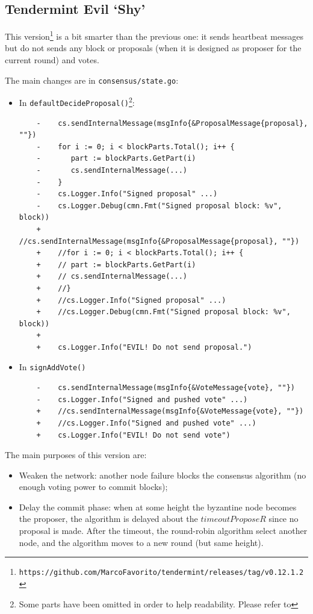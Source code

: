 \documentclass[]{article}
\begin{document}
\subsection{Tendermint Evil `Shy'}
\label{shy}
This version\footnote{\texttt{https://github.com/MarcoFavorito/tendermint/releases/tag/v0.12.1.2}} is a bit smarter than the previous one: it sends heartbeat messages but do not sends any block or proposals (when it is designed as proposer for the current round) and votes.

The main changes are in \texttt{consensus/state.go}:
\begin{itemize}
	\item In \texttt{defaultDecideProposal()}\footnote{Some parts have been omitted in order to help readability. Please refer to }:
	\begin{verbatim}
	-    cs.sendInternalMessage(msgInfo{&ProposalMessage{proposal}, ""})
	-    for i := 0; i < blockParts.Total(); i++ {
	-    	part := blockParts.GetPart(i)
	-    	cs.sendInternalMessage(...)
	-    }
	-    cs.Logger.Info("Signed proposal" ...)
	-    cs.Logger.Debug(cmn.Fmt("Signed proposal block: %v", block))
	+    //cs.sendInternalMessage(msgInfo{&ProposalMessage{proposal}, ""})
	+    //for i := 0; i < blockParts.Total(); i++ {
	+    //	part := blockParts.GetPart(i)
	+    //	cs.sendInternalMessage(...)
	+    //}
	+    //cs.Logger.Info("Signed proposal" ...)
	+    //cs.Logger.Debug(cmn.Fmt("Signed proposal block: %v", block))
	+
	+    cs.Logger.Info("EVIL! Do not send proposal.")
	\end{verbatim}
	\item In \texttt{signAddVote()}
	\begin{verbatim}
	-    cs.sendInternalMessage(msgInfo{&VoteMessage{vote}, ""})
	-    cs.Logger.Info("Signed and pushed vote" ...)
	+    //cs.sendInternalMessage(msgInfo{&VoteMessage{vote}, ""})
	+    //cs.Logger.Info("Signed and pushed vote" ...)
	+    cs.Logger.Info("EVIL! Do not send vote")	
	\end{verbatim}
\end{itemize}
The main purposes of this version are:
\begin{itemize}
\item Weaken the network: another node failure blocks the consensus algorithm (no enough voting power to commit blocks);
\item Delay the commit phase: when at some height the byzantine node becomes the proposer, the algorithm is delayed about the $timeoutProposeR$ since no proposal is made. After the timeout, the round-robin algorithm select another node, and the algorithm moves to a new round (but same height).
\end{itemize}
\end{document}
